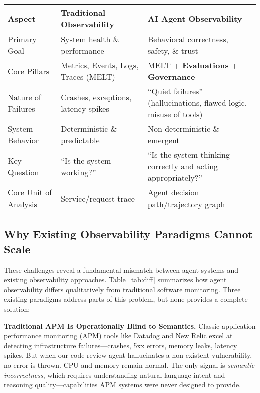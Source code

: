 \documentclass[sigplan,screen,9pt]{acmart}
\begin{document}
\begin{table*}[t]
  \caption{Traditional vs. Agent Observability: A Comparative Framework}
  \label{tab:diff}
  \centering
  \begin{tabular}{@{}p{3cm}p{5.5cm}p{5.5cm}@{}}
    \toprule
    \textbf{Aspect} &
    \textbf{Traditional Observability} &
    \textbf{AI Agent Observability} \\
    \midrule
    Primary Goal &
    System health \& performance &
    Behavioral correctness, safety, \& trust \\
    Core Pillars &
    Metrics, Events, Logs, Traces (MELT) &
    MELT + \textbf{Evaluations} + \textbf{Governance} \\
    Nature of Failures &
    Crashes, exceptions, latency spikes &
    ``Quiet failures'' (hallucinations, flawed logic, misuse of tools) \\
    System Behavior &
    Deterministic \& predictable &
    Non-deterministic \& emergent \\
    Key Question &
    ``Is the system working?'' &
    ``Is the system thinking correctly and acting appropriately?'' \\
    Core Unit of Analysis &
    Service/request trace &
    Agent decision path/trajectory graph \\
    \bottomrule
  \end{tabular}
\end{table*}

\subsection{Why Existing Observability Paradigms Cannot Scale}

These challenges reveal a fundamental mismatch between agent systems and existing observability approaches. Table~\ref{tab:diff} summarizes how agent observability differs qualitatively from traditional software monitoring. Three existing paradigms address parts of this problem, but none provides a complete solution:

\textbf{Traditional APM Is Operationally Blind to Semantics.} Classic application performance monitoring (APM) tools like Datadog and New Relic excel at detecting infrastructure failures—crashes, 5xx errors, memory leaks, latency spikes. But when our code review agent hallucinates a non-existent vulnerability, no error is thrown. CPU and memory remain normal. The only signal is \emph{semantic incorrectness}, which requires understanding natural language intent and reasoning quality—capabilities APM systems were never designed to provide.
\end{document}

